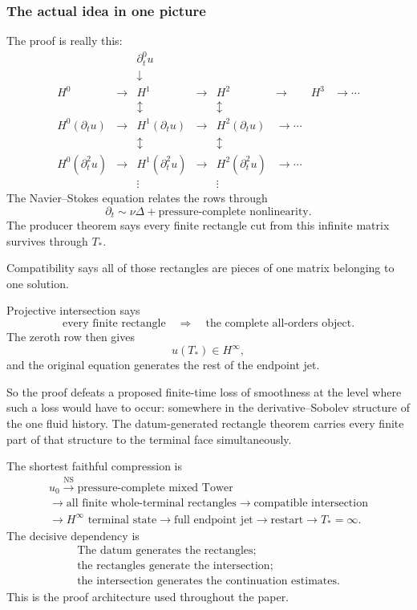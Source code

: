 \documentclass[11pt]{article}
\theoremstyle{definition}
\theoremstyle{remark}
\begin{document}
\subsubsection*{The actual idea in one picture}

The proof is really this:
\[
\boxed{
\begin{array}{ccccccccc}
&&\partial_t^0u&&&&\\
&&\downarrow&&&&\\
H^0&\longrightarrow&H^1&\longrightarrow&H^2&\longrightarrow&H^3&\longrightarrow\cdots\\
&&\updownarrow&&\updownarrow&&\\
H^0(\partial_tu)&\longrightarrow&H^1(\partial_tu)&\longrightarrow&H^2(\partial_tu)&\longrightarrow\cdots\\
&&\updownarrow&&\updownarrow&&\\
H^0(\partial_t^2u)&\longrightarrow&H^1(\partial_t^2u)&\longrightarrow&H^2(\partial_t^2u)&\longrightarrow\cdots\\
&&\vdots&&\vdots&
\end{array}
}
\]
The Navier--Stokes equation relates the rows through
\[
\boxed{
\partial_t
\sim
\nu\Delta
+
\text{pressure-complete nonlinearity}.
}
\]
The producer theorem says every finite rectangle cut from this infinite matrix
survives through \(T_*\).

Compatibility says all of those rectangles are pieces of one matrix belonging
to one solution.

Projective intersection says
\[
\boxed{
\text{every finite rectangle}
\quad\Longrightarrow\quad
\text{the complete all-orders object}.
}
\]
The zeroth row then gives
\[
u(T_*)\in H^\infty,
\]
and the original equation generates the rest of the endpoint jet.

So the proof defeats a proposed finite-time loss of smoothness at the level where
such a loss would have to occur: somewhere in the derivative--Sobolev structure
of the one fluid history.  The datum-generated rectangle theorem carries every
finite part of that structure to the terminal face simultaneously.

The shortest faithful compression is
\[
\boxed{
\begin{gathered}
u_0
\overset{\mathrm{NS}}{\longrightarrow}
\text{pressure-complete mixed Tower}
\\
\longrightarrow
\text{all finite whole-terminal rectangles}
\longrightarrow
\text{compatible intersection}
\\
\longrightarrow
H^\infty\text{ terminal state}
\longrightarrow
\text{full endpoint jet}
\longrightarrow
\text{restart}
\longrightarrow
T_*=\infty.
\end{gathered}
}
\]
The decisive dependency is
\[
\boxed{
\begin{gathered}
\text{The datum generates the rectangles;}\\
\text{the rectangles generate the intersection;}\\
\text{the intersection generates the continuation estimates.}
\end{gathered}
}
\]
This is the proof architecture used throughout the paper.
\endgroup
\clearpage
\end{document}
